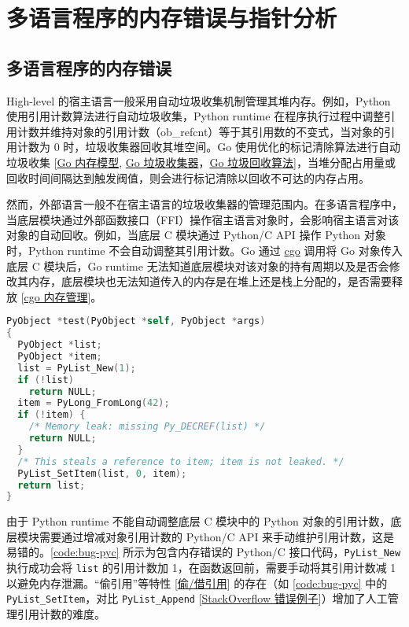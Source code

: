 \section{多语言程序的内存错误与指针分析}

\subsection{多语言程序的内存错误}

High-level 的宿主语言一般采用自动垃圾收集机制管理其堆内存。例如，Python 使用引用计数算法进行自动垃圾收集，Python runtime 在程序执行过程中调整引用计数并维持对象的引用计数（ob\_refcnt）等于其引用数的不变式，当对象的引用计数为 0 时，垃圾收集器回收其堆空间。Go 使用优化的标记清除算法进行自动垃圾收集 [\href{https://zhuanlan.zhihu.com/p/76802887}{Go 内存模型}, \href{https://tip.golang.org/doc/gc-guide}{Go 垃圾收集器}，\href{https://zhuanlan.zhihu.com/p/390926887}{Go 垃圾回收算法}]，当堆分配占用量或回收时间间隔达到触发阀值，则会进行标记清除以回收不可达的内存占用。

然而，外部语言一般不在宿主语言的垃圾收集器的管理范围内。在多语言程序中，当底层模块通过外部函数接口（FFI）操作宿主语言对象时，会影响宿主语言对该对象的自动回收。例如，当底层 C 模块通过 Python/C API 操作 Python 对象时，Python runtime 不会自动调整其引用计数。Go 通过 \href{https://golang.google.cn/cmd/cgo/}{cgo} 调用将 Go 对象传入底层 C 模块后，Go runtime 无法知道底层模块对该对象的持有周期以及是否会修改其内存，底层模块也无法知道传入的内存是在堆上还是栈上分配的，是否需要释放 [\href{https://www.pengrl.com/p/29054/}{cgo 内存管理}]。

\begin{lstfloat}
\begin{lstlisting}[language={C},caption={错误的 Python/C 接口程序},label={code:bug-pyc}]
PyObject *test(PyObject *self, PyObject *args)
{
  PyObject *list;
  PyObject *item;
  list = PyList_New(1);
  if (!list)
    return NULL;
  item = PyLong_FromLong(42);
  if (!item) {
    /* Memory leak: missing Py_DECREF(list) */
    return NULL;
  }
  /* This steals a reference to item; item is not leaked. */
  PyList_SetItem(list, 0, item);
  return list;
}
\end{lstlisting}
\end{lstfloat}

由于 Python runtime 不能自动调整底层 C 模块中的 Python 对象的引用计数，底层模块需要通过增减对象引用计数的 Python/C API 来手动维护引用计数，这是易错的。\autoref{code:bug-pyc} 所示为包含内存错误的 Python/C 接口代码，\texttt{PyList\_New} 执行成功会将 \texttt{list} 的引用计数加 1，在函数返回前，需要手动将其引用计数减 1 以避免内存泄漏。“偷引用”等特性 [\href{https://docs.python.org/3/c-api/intro.html#reference-count-details}{偷/借引用}] 的存在（如 \autoref{code:bug-pyc} 中的 \texttt{PyList\_SetItem}，对比 \texttt{PyList\_Append} [\href{https://stackoverflow.com/questions/57143041/memory-leak-in-c-extension-for-python}{StackOverflow 错误例子}]）增加了人工管理引用计数的难度。

